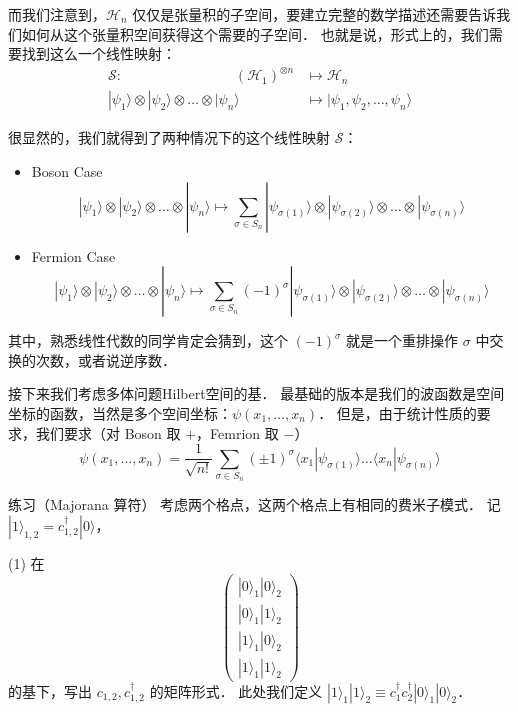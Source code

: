 而我们注意到，$\mathcal{H}_n$ 仅仅是张量积的子空间，要建立完整的数学描述还需要告诉我们如何从这个张量积空间获得这个需要的子空间． 也就是说，形式上的，我们需要找到这么一个线性映射：
\begin{align}
\mathcal{S}:\quad\quad\quad\quad\quad\quad\quad\quad (\mathcal{H}_1)^{\otimes n}&\mapsto\mathcal{H}_n\\
|\psi_1\rangle\otimes|\psi_2\rangle\otimes\dots\otimes|\psi_n\rangle &\mapsto|\psi_1,\psi_2,\dots,\psi_n\rangle
\end{align}

很显然的，我们就得到了两种情况下的这个线性映射 $\mathcal{S}$：
\begin{itemize}
\item Boson Case
\begin{equation}
|\psi_1\rangle\otimes|\psi_2\rangle\otimes\dots\otimes|\psi_n\rangle \mapsto \sum_{{\sigma}\in S_n}|\psi_{\sigma(1)}\rangle\otimes|\psi_{\sigma(2)}\rangle\otimes\dots\otimes|\psi_{\sigma(n)}\rangle
\end{equation}
\item Fermion Case
\begin{equation}
|\psi_1\rangle\otimes|\psi_2\rangle\otimes\dots\otimes|\psi_n\rangle \mapsto \sum_{{\sigma}\in S_n}(-1)^{\sigma}|\psi_{\sigma(1)}\rangle\otimes|\psi_{\sigma(2)}\rangle\otimes\dots\otimes|\psi_{\sigma(n)}\rangle
\end{equation}
\end{itemize}

其中，熟悉线性代数的同学肯定会猜到，这个 $(-1)^{\sigma}$ 就是一个重排操作 $\sigma$ 中交换的次数，或者说逆序数．

接下来我们考虑多体问题Hilbert空间的基． 最基础的版本是我们的波函数是空间坐标的函数，当然是多个空间坐标：$\psi(x_1,\dots,x_n)$． 但是，由于统计性质的要求，我们要求（对 Boson 取 $+$，Femrion 取 $-$）
\begin{equation}
\psi(x_1,\dots,x_n)=\frac{1}{\sqrt{n!}}\sum_{\sigma\in S_n}(\pm1)^\sigma\langle x_1|\psi_{\sigma(1)}\rangle\dots\langle x_n|\psi_{\sigma(n)}\rangle
\end{equation}

\begin{exer}{练习（Majorana 算符）}
考虑两个格点，这两个格点上有相同的费米子模式． 记 $|1\rangle_{1,2}=c_{1,2}^\dagger|0\rangle$，

(1) 在
\begin{equation}
\left(\begin{matrix}|0\rangle_1|0\rangle_2\\|0\rangle_1|1\rangle_2\\|1\rangle_1|0\rangle_2\\|1\rangle_1|1\rangle_2\end{matrix}\right) 
\end{equation}
的基下，写出 $c_{1,2}, c_{1,2}^\dagger$ 的矩阵形式． 此处我们定义 $|1\rangle_1|1\rangle_2\equiv c_1^\dagger c_2^\dagger|0\rangle_1|0\rangle_2$．
\end{exer}